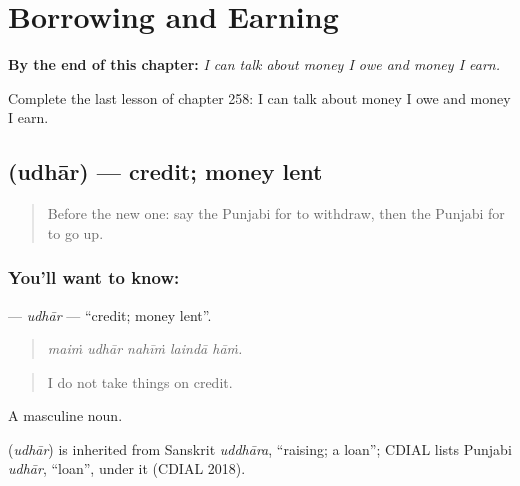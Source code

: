 
\chapter{Borrowing and Earning}
\label{ch:pa-a2-borrowing-and-earning}

\begin{chapteropening}
\textbf{By the end of this chapter:} \emph{I can talk about money I owe and money I earn.}

Complete the last lesson of chapter 258: I can talk about money I owe and money I earn.
\end{chapteropening}

\section[\texorpdfstring{\pa{ਉਧਾਰ} (udhār)}{ਉਧਾਰ (udhār)}]{ (udhār) — credit; money lent}

\label{lesson:PA-C258-udhar}



\begin{quote}
Before the new one: say the Punjabi for to withdraw, then the Punjabi for to go up.
\end{quote}

\subsection*{You'll want to know: }
\textbf{} — \emph{udhār} — \textquotedblleft{}credit; money lent\textquotedblright{}.

\begin{quote}
    
\end{quote}

\begin{quote}
\emph{maiṁ udhār nahīṁ laindā hāṁ.}
\end{quote}

\begin{quote}
I do not take things on credit.
\end{quote}

A masculine noun.

\begin{cousinweb}
\textbf{} (\emph{udhār}) is inherited from Sanskrit \emph{uddhāra}, \textquotedblleft{}raising; a loan\textquotedblright{}; CDIAL lists Punjabi \emph{udhār}, \textquotedblleft{}loan\textquotedblright{}, under it (CDIAL 2018).
\end{cousinweb}

